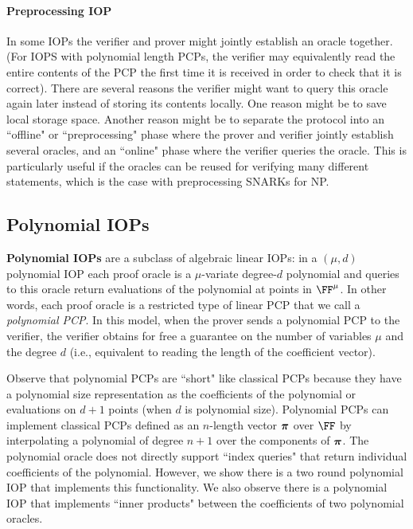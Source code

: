 \paragraph{Preprocessing IOP} In some IOPs the verifier and prover might jointly establish an oracle together. (For IOPS with polynomial length PCPs, the verifier may equivalently read the entire contents of the PCP the first time it is received in order to check that it is correct). There are several reasons the verifier might want to query this oracle again later instead of storing its contents locally. One reason might be to save local storage space. Another reason might be to separate the protocol into an ``offline" or ``preprocessing" phase where the prover and verifier jointly establish several oracles, and an ``online" phase where the verifier queries the oracle. This is particularly useful if the oracles can be reused for verifying many different statements, which is the case with preprocessing SNARKs for NP.  %

\subsection{Polynomial IOPs} 
\textbf{Polynomial IOPs} are a subclass of algebraic linear IOPs: in a $(\mu, d)$ polynomial IOP each proof oracle is a $\mu$-variate degree-$d$ polynomial and queries to this oracle return evaluations of the polynomial at points in $\FF^\mu$. In other words, each proof oracle is a restricted type of linear PCP that we call a \emph{polynomial PCP}. In this model, when the prover sends a polynomial PCP to the verifier, the verifier obtains for free a guarantee on the number of variables $\mu$ and the degree $d$ (i.e., equivalent to reading the length of the coefficient vector). 

Observe that polynomial PCPs are ``short" like classical PCPs because they have a polynomial size representation as the coefficients of the polynomial or evaluations on $d+1$ points (when $d$ is polynomial size). Polynomial PCPs can implement classical PCPs defined as an $n$-length vector $\boldsymbol{\pi}$ over $\FF$ by interpolating a polynomial of degree $n+1$ over the components of $\boldsymbol{\pi}$. The polynomial oracle does not directly support ``index queries" that return individual coefficients of the polynomial. However, we show there is a two round polynomial IOP that implements this functionality. We also observe there is a polynomial IOP that implements ``inner products" between the coefficients of two polynomial oracles. 

